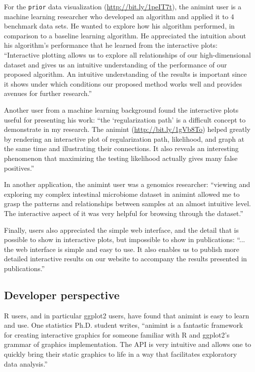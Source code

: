 \documentclass[journal]{vgtc}\usepackage[]{graphicx}\usepackage[]{color}
\begin{document}
For the \texttt{prior} data visualization
(\url{http://bit.ly/1peIT7t}), the animint user is a machine learning
researcher who developed an algorithm and applied it to 4 benchmark
data sets. He wanted to explore how his algorithm performed, in
comparison to a baseline learning algorithm. He appreciated the
intuition about his algorithm's performance that he learned from the
interactive plots: ``Interactive plotting allows us to explore all
relationships of our high-dimensional dataset and gives us an
intuitive understanding of the performance of our proposed
algorithm. An intuitive understanding of the results is important
since it shows under which conditions our proposed method works well
and provides avenues for further research.''

Another user from a machine learning background found the interactive
plots useful for presenting his work: ``the `regularization path' is a
difficult concept to demonstrate in my research. The animint
(\url{http://bit.ly/1gVb8To}) helped greatly by rendering an
interactive plot of regularization path, likelihood, and graph at the
same time and illustrating their connections. It also reveals an
interesting phenomenon that maximizing the testing likelihood actually
gives many false positives.''

In another application, the animint user was a genomics researcher:
``viewing and exploring my complex intestinal microbiome dataset in
animint allowed me to grasp the patterns and relationships between
samples at an almost intuitive level. The interactive aspect of it was
very helpful for browsing through the dataset.''

Finally, users also appreciated the simple web interface, and the
detail that is possible to show in interactive plots, but impossible
to show in publications: ``...  the web interface is simple and easy
to use.  It also enables us to publish more detailed interactive
results on our website to accompany the results presented in
publications.''

\subsection{Developer perspective}

R users, and in particular ggplot2 users, have found that animint 
is easy to learn and use. One statistics Ph.D. student writes, 
``animint is a fantastic framework for creating
interactive graphics for someone familiar with R and ggplot2's grammar
of graphics implementation. The API is very intuitive and allows one
to quickly bring their static graphics to life in a way that
facilitates exploratory data analysis.''
\end{document}

